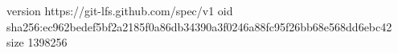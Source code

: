 version https://git-lfs.github.com/spec/v1
oid sha256:ec962bedef5bf2a2185f0a86db34390a3f0246a88fc95f26bb68e568dd6ebc42
size 1398256
